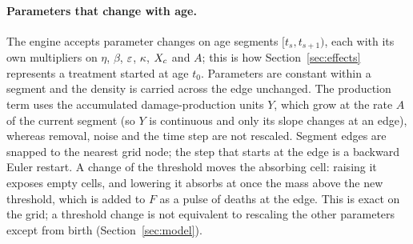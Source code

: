 \paragraph{Parameters that change with age.} The engine accepts parameter changes on age segments
$[t_s,t_{s+1})$, each with its own multipliers on $\eta$, $\beta$, $\varepsilon$, $\kappa$, $X_c$ and $A$; this is how
Section~\ref{sec:effects} represents a treatment started at age $t_0$. Parameters are constant within a segment and the
density is carried across the edge unchanged. The production term uses the accumulated damage-production units $Y$, which grow
at the rate $A$ of the current segment (so $Y$ is continuous and only its slope changes at an edge), whereas removal, noise
and the time step are not rescaled. Segment edges are snapped to the nearest grid node; the step that starts at the edge is a
backward Euler restart. A change of the threshold moves the absorbing cell: raising it exposes empty cells, and lowering it
absorbs at once the mass above the new threshold, which is added to $F$ as a pulse of deaths at the edge. This is exact
on the grid; a threshold change is not equivalent to rescaling the other parameters except from birth
(Section~\ref{sec:model}).


